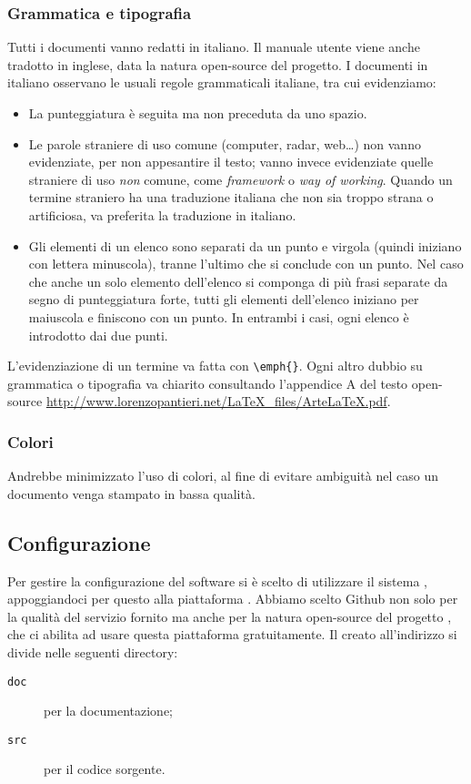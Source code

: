 \subsubsection{Grammatica e tipografia} Tutti i documenti vanno redatti in italiano. Il manuale utente viene anche tradotto in inglese, data la natura open-source del progetto. I documenti in italiano osservano le usuali regole grammaticali italiane, tra cui evidenziamo:
\begin{itemize}
	\item La punteggiatura è seguita ma non preceduta da uno spazio.
	\item Le parole straniere di uso comune (computer, radar, web\dots) non vanno evidenziate, per non appesantire il testo; vanno invece evidenziate quelle straniere di uso \emph{non} comune, come \emph{framework} o \emph{way of working}. Quando un termine straniero ha una traduzione italiana che non sia troppo strana o artificiosa, va preferita la traduzione in italiano.
	\item Gli elementi di un elenco sono separati da un punto e virgola (quindi iniziano con lettera minuscola), tranne l'ultimo che si conclude con un punto. Nel caso che anche un solo elemento dell'elenco si componga di più frasi separate da segno di punteggiatura forte, tutti gli elementi dell'elenco iniziano per maiuscola e finiscono con un punto. In entrambi i casi, ogni elenco è introdotto dai due punti.
\end{itemize}
L'evidenziazione di un termine va fatta con \texttt{\textbackslash emph\{\}}. Ogni altro dubbio su grammatica o tipografia va chiarito consultando l'appendice A del testo open-source \url{http://www.lorenzopantieri.net/LaTeX_files/ArteLaTeX.pdf}.

\subsubsection{Colori} Andrebbe minimizzato l'uso di colori, al fine di evitare ambiguità nel caso un documento venga stampato in bassa qualità.

\subsection{Configurazione} \label{sec:config}
Per gestire la configurazione del software si è scelto di utilizzare il sistema , appoggiandoci per questo alla piattaforma . Abbiamo scelto Github non solo per la qualità del servizio fornito ma anche per la natura open-source del progetto \proj, che ci abilita ad usare questa piattaforma gratuitamente. Il  creato all'indirizzo \repo{} si divide nelle seguenti directory:
\begin{description}
	\item[\texttt{doc}] per la documentazione;
	\item[\texttt{src}] per il codice sorgente.
\end{description}

